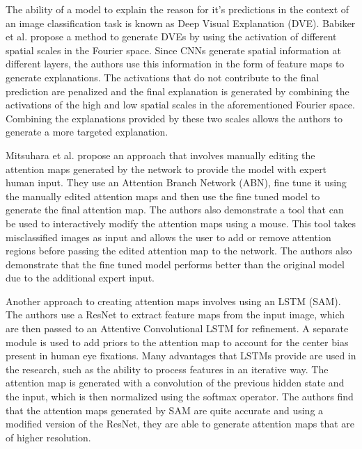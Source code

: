 The ability of a model to explain the reason for it's predictions in the context of an image classification task is known as Deep Visual Explanation (DVE). Babiker et al. \cite{babikerIntroductionDeepVisual2018} propose a method to generate DVEs by using the activation of different spatial scales in the Fourier space. Since CNNs generate spatial information at different layers, the authors use this information in the form of feature maps to generate explanations. The activations that do not contribute to the final prediction are penalized and the final explanation is generated by combining the activations of the high and low spatial scales in the aforementioned Fourier space. Combining the explanations provided by these two scales allows the authors to generate a more targeted explanation.

Mitsuhara et al. \cite{mitsuharaEmbeddingHumanKnowledge2019} propose an approach that involves manually editing the attention maps generated by the network to provide the model with expert human input. They use an Attention Branch Network (ABN), fine tune it using the manually edited attention maps and then use the fine tuned model to generate the final attention map. The authors also demonstrate a tool that can be used to interactively modify the attention maps using a mouse. This tool takes misclassified images as input and allows the user to add or remove attention regions before passing the edited attention map to the network. The authors also demonstrate that the fine tuned model performs better than the original model due to the additional expert input.

Another approach to creating attention maps involves using an LSTM \cite{corniaPredictingHumanEye2018} (SAM). The authors use a ResNet to extract feature maps from the input image, which are then passed to an Attentive Convolutional LSTM for refinement. A separate module is used to add priors to the attention map to account for the center bias present in human eye fixations. Many advantages that LSTMs provide are used in the research, such as the ability to process features in an iterative way. The attention map is generated with a convolution of the previous hidden state and the input, which is then normalized using the softmax operator. The authors find that the attention maps generated by SAM are quite accurate and using a modified version of the ResNet, they are able to generate attention maps that are of higher resolution.

